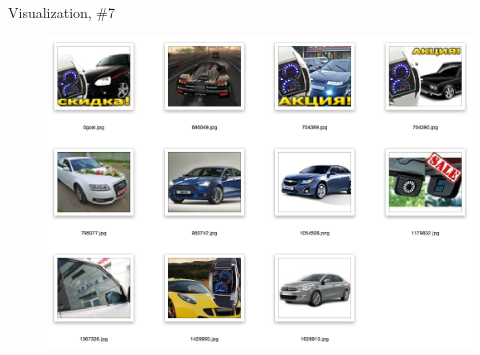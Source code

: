 \documentclass{beamer}
\begin{document}
\begin{frame}{Visualization, \#7}

\begin{figure}[h!]
  \centering
  \includegraphics[width=1\textwidth]{images/search7.png}
\end{figure}

\end{frame}

\end{document}
